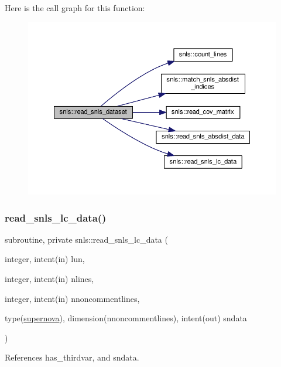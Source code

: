 Here is the call graph for this function\+:
\nopagebreak
\begin{figure}[H]
\begin{center}
\leavevmode
\includegraphics[width=350pt]{namespacesnls_ae4b5fd7439c0c4620a5d9369c2782c9a_cgraph}
\end{center}
\end{figure}
\mbox{\label{namespacesnls_a7f1db3cfd4fe644d65ae48d23062420a}} 
\subsubsection{\texorpdfstring{read\+\_\+snls\+\_\+lc\+\_\+data()}{read\_snls\_lc\_data()}}
{\footnotesize\ttfamily subroutine, private snls\+::read\+\_\+snls\+\_\+lc\+\_\+data (\begin{DoxyParamCaption}\item[{integer, intent(in)}]{lun,  }\item[{integer, intent(in)}]{nlines,  }\item[{integer, intent(in)}]{nnoncommentlines,  }\item[{type(\mbox{\hyperlink{structsnls_1_1supernova}{supernova}}), dimension(nnoncommentlines), intent(out)}]{sndata }\end{DoxyParamCaption})\hspace{0.3cm}{\ttfamily [private]}}



References has\+\_\+thirdvar, and sndata.



